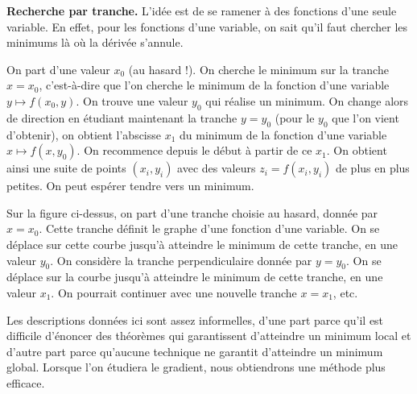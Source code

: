 \textbf{Recherche par tranche.} 
L'idée est de se ramener à des fonctions d'une seule variable. En effet, 
pour les fonctions d'une variable, on sait qu'il faut chercher les minimums là où la dérivée s'annule.

On part d'une valeur $x_0$ (au hasard !). On cherche le minimum sur la tranche $x=x_0$, c'est-à-dire que l'on cherche le minimum de la fonction d'une variable $y \mapsto f(x_0,y)$. On trouve une valeur $y_0$ qui réalise un minimum. On change alors de direction en étudiant maintenant la tranche $y=y_0$ (pour le $y_0$ que l'on vient d'obtenir), on obtient l'abscisse $x_1$ du minimum de la fonction d'une variable $x \mapsto f(x,y_0)$. On recommence depuis le début à partir de ce $x_1$. On obtient ainsi une suite de points $(x_i,y_i)$ avec des valeurs $z_i=f(x_i,y_i)$ de plus en plus petites. On peut espérer tendre vers un minimum. %



Sur la figure ci-dessus, on part d'une tranche choisie au hasard, donnée par $x=x_0$. Cette tranche définit le graphe d'une fonction d'une variable. On se déplace sur cette courbe jusqu'à atteindre le minimum de cette tranche, en une valeur $y_0$. On considère la tranche perpendiculaire donnée par $y=y_0$. On se déplace sur la courbe jusqu'à atteindre le minimum de cette tranche, en une valeur $x_1$. On pourrait continuer avec une nouvelle tranche $x=x_1$, etc.

\bigskip

Les descriptions données ici sont assez informelles, d'une part parce qu'il est difficile d'énoncer des théorèmes qui garantissent d'atteindre un minimum local et d'autre part parce qu'aucune technique ne garantit d'atteindre un minimum global. Lorsque l'on étudiera le gradient, nous obtiendrons une méthode plus efficace.

